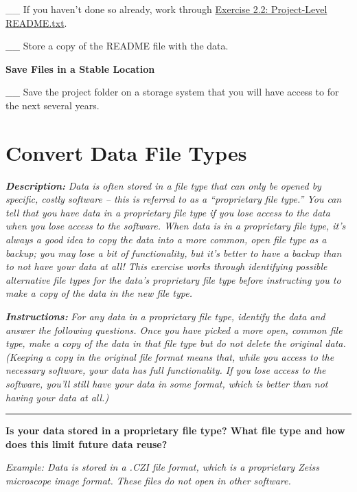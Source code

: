 \documentclass[
]{book}
\begin{document}
\_\_ If you haven't done so already, work through \protect\hyperlink{readme-txt}{Exercise 2.2: Project-Level README.txt}.

\_\_ Store a copy of the README file with the data.

\textbf{Save Files in a Stable Location}

\_\_ Save the project folder on a storage system that you will have access to for the next several years.

\hypertarget{file-type}{%
\section{Convert Data File Types}\label{file-type}}

\textbf{\emph{Description:}} \emph{Data is often stored in a file type that can only be opened by specific, costly software -- this is referred to as a ``proprietary file type.'' You can tell that you have data in a proprietary file type if you lose access to the data when you lose access to the software. When data is in a proprietary file type, it's always a good idea to copy the data into a more common, open file type as a backup; you may lose a bit of functionality, but it's better to have a backup than to not have your data at all! This exercise works through identifying possible alternative file types for the data's proprietary file type before instructing you to make a copy of the data in the new file type.}

\textbf{\emph{Instructions:}} \emph{For any data in a proprietary file type, identify the data and answer the following questions. Once you have picked a more open, common file type, make a copy of the data in that file type but do not delete the original data. (Keeping a copy in the original file format means that, while you access to the necessary software, your data has full functionality. If you lose access to the software, you'll still have your data in some format, which is better than not having your data at all.)}

\begin{center}\rule{0.5\linewidth}{0.5pt}\end{center}

\textbf{Is your data stored in a proprietary file type? What file type and how does this limit future data reuse?}

\emph{Example: Data is stored in a .CZI file format, which is a proprietary Zeiss microscope image format. These files do not open in other software.}
\end{document}
